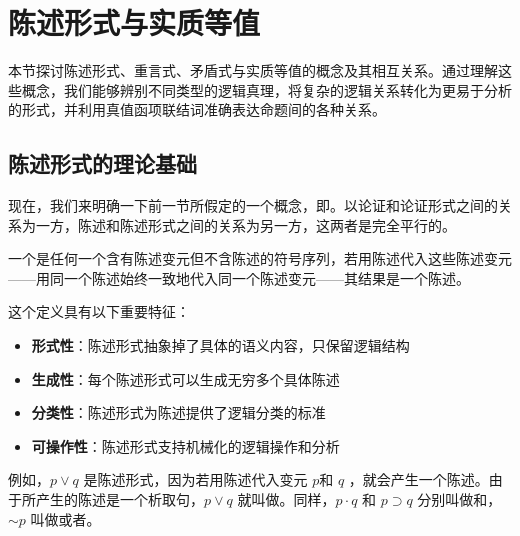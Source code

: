 \section{陈述形式与实质等值}

\begin{logicbox}[title=引言]
本节探讨陈述形式、重言式、矛盾式与实质等值的概念及其相互关系。通过理解这些概念，我们能够辨别不同类型的逻辑真理，将复杂的逻辑关系转化为更易于分析的形式，并利用真值函项联结词准确表达命题间的各种关系。
\end{logicbox}

\subsection{陈述形式的理论基础}

现在，我们来明确一下前一节所假定的一个概念，即。以论证和论证形式之间的关系为一方，陈述和陈述形式之间的关系为另一方，这两者是完全平行的。

\begin{theorembox}[title=陈述形式的数学定义]
一个是任何一个含有陈述变元但不含陈述的符号序列，若用陈述代入这些陈述变元——用同一个陈述始终一致地代入同一个陈述变元——其结果是一个陈述。

这个定义具有以下重要特征：
\begin{itemize}
\item \textbf{形式性}：陈述形式抽象掉了具体的语义内容，只保留逻辑结构
\item \textbf{生成性}：每个陈述形式可以生成无穷多个具体陈述
\item \textbf{分类性}：陈述形式为陈述提供了逻辑分类的标准
\item \textbf{可操作性}：陈述形式支持机械化的逻辑操作和分析
\end{itemize}
\end{theorembox}

例如，$p \vee q$ 是陈述形式，因为若用陈述代入变元 $p$和 $q$ ，就会产生一个陈述。由于所产生的陈述是一个析取句，$p \vee q$ 就叫做。同样，$p \cdot q$ 和 $p \supset q$ 分别叫做和，$\sim p$ 叫做或者。

